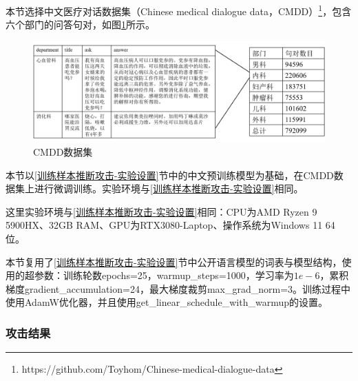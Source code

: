 
本节选择中文医疗对话数据集（Chinese medical dialogue data，CMDD）\footnote{https://github.com/Toyhom/Chinese-medical-dialogue-data}，包含六个部门的问答句对，如图\ref{CMDD_Data}所示。

\begin{figure}[h]
	\centering
	\includegraphics[width=\linewidth]{figures/CMDD_Data.png}
	\caption{CMDD数据集}
	\label{CMDD_Data}
\end{figure}



本节以\ref{训练样本推断攻击-实验设置}节中的中文预训练模型为基础，在CMDD数据集上进行微调训练。实验环境与\ref{训练样本推断攻击-实验设置}相同。

这里实验环境与\ref{训练样本推断攻击-实验设置}相同：CPU为AMD Ryzen 9 5900HX、32GB RAM、GPU为RTX3080-Laptop、操作系统为Windows 11 64位。

本节复用了\ref{训练样本推断攻击-实验设置}节中公开语言模型的词表与模型结构，使用的超参数：训练轮数epochs=25，warmup\_steps=1000，学习率为$1e-6$，累积梯度gradient\_accumulation=24，最大梯度裁剪max\_grad\_norm=3。训练过程中使用AdamW优化器，并且使用get\_linear\_schedule\_with\_warmup的设置。


\subsubsection{攻击结果}


